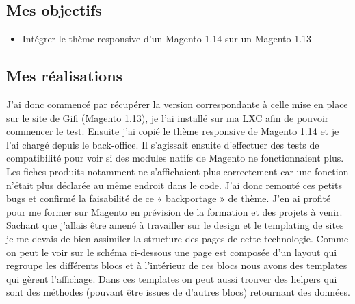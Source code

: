 \documentclass[a4paper,11pt,twoside]{report}
\begin{document}
    \subsection*{Mes objectifs}
      \begin{itemize}

	\item Intégrer le thème responsive d'un Magento 1.14 sur un Magento 1.13 

      \end{itemize}
    \subsection*{Mes réalisations}
    J'ai donc commencé par récupérer la version correspondante à celle mise en place sur le site de Gifi (Magento 1.13), je l'ai installé sur ma LXC afin de pouvoir commencer le test. Ensuite j'ai copié le thème responsive de Magento 1.14 et je l'ai chargé depuis le back-office. Il s'agissait ensuite d'effectuer des tests de compatibilité pour voir si des modules natifs de Magento ne fonctionnaient plus. Les fiches produits notamment ne s'affichaient plus correctement car une fonction n'était plus déclarée au même endroit dans le code. J'ai donc remonté ces petits bugs et confirmé la faisabilité de ce « backportage » de thème. J'en ai profité pour me former sur Magento en prévision de la formation et des projets à venir. Sachant que j'allais être amené à travailler sur le design et le templating de sites je me devais de bien assimiler la structure des pages de cette technologie. Comme on peut le voir sur le schéma ci-dessous une page est composée d'un layout qui regroupe les différents blocs et à l'intérieur de ces blocs nous avons des templates qui gèrent l'affichage. Dans ces templates on peut aussi trouver des helpers qui sont des méthodes (pouvant être issues de d'autres blocs) retournant des données.
    
\end{document}
